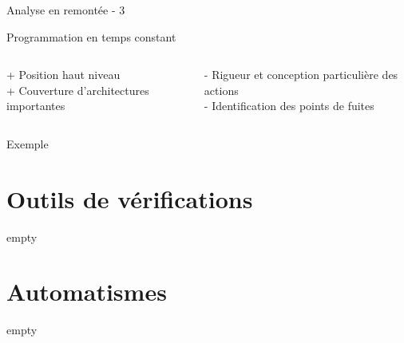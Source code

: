 \documentclass{backend/backend}
\begin{document}
\begin{frame}{Analyse en remontée - 3}

    \begin{blockSimple}{Programmation en temps constant}
        \begin{columns}
            \begin{column}{0.3\textwidth}
                + Position haut niveau\\
                + Couverture d'architectures importantes
            \end{column}
            \begin{column}{0.5\textwidth}
            - Rigueur et conception particulière des actions\\
            - Identification des points de fuites
            \end{column}
        \end{columns}        
    \end{blockSimple}

    \vspace{4em}
    \begin{blockSimple}{}
        \centering
    \end{blockSimple}
\end{frame}



\begin{frame}{Exemple}

\end{frame}


\section{Outils de vérifications}
\begin{frame}{empty}
    
\end{frame}
\section{Automatismes}
\begin{frame}{empty}
    
\end{frame}
\end{document}
